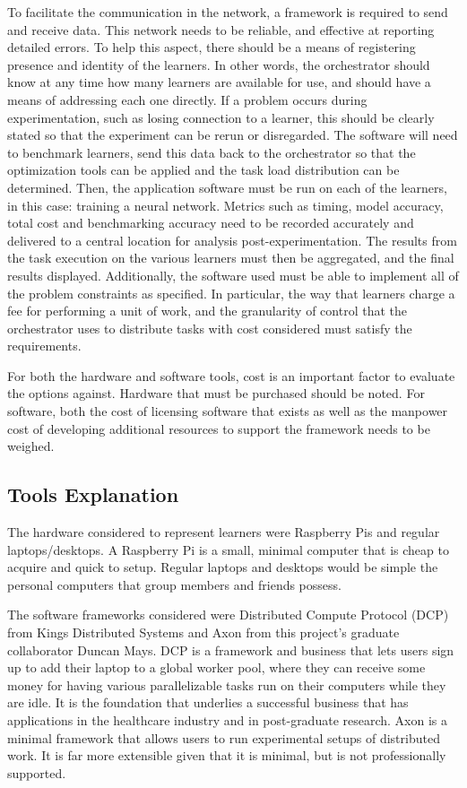 \documentclass[../mthe-493-final-project.tex]{subfiles}
\begin{document}
    To facilitate the communication in the network, a framework is required to send and receive data. This network needs to be reliable, and effective at reporting detailed errors. To help this aspect, there should be a means of registering presence and identity of the learners. In other words, the orchestrator should know at any time how many learners are available for use, and should have a means of addressing each one directly. If a problem occurs during experimentation, such as losing connection to a learner, this should be clearly stated so that the experiment can be rerun or disregarded. The software will need to benchmark learners, send this data back to the orchestrator so that the optimization tools can be applied and the task load distribution can be determined. Then, the application software must be run on each of the learners, in this case: training a neural network. Metrics such as timing, model accuracy, total cost and benchmarking accuracy need to be recorded accurately and delivered to a central location for analysis post-experimentation. The results from the task execution on the various learners must then be aggregated, and the final results displayed. Additionally, the software used must be able to implement all of the problem constraints as specified. In particular, the way that learners charge a fee for performing a unit of work, and the granularity of control that the orchestrator uses to distribute tasks with cost considered must satisfy the requirements.
    
    For both the hardware and software tools, cost is an important factor to evaluate the options against. Hardware that must be purchased should be noted. For software, both the cost of licensing software that exists as well as the manpower cost of developing additional resources to support the framework needs to be weighed. 
    
    \subsection{Tools Explanation}
    The hardware considered to represent learners were Raspberry Pis and regular laptops/desktops. A Raspberry Pi is a small, minimal computer that is cheap to acquire and quick to setup. Regular laptops and desktops would be simple the personal computers that group members and  friends possess. 
    
    The software frameworks considered were Distributed Compute Protocol (DCP) from Kings Distributed Systems and Axon from this project's graduate collaborator Duncan Mays. DCP is a framework and business that lets users sign up to add their laptop to a global worker pool, where they can receive some money for having various parallelizable tasks run on their computers while they are idle. It is the foundation that underlies a successful business that has applications in the healthcare industry and in post-graduate research. Axon is a minimal framework that allows users to run experimental setups of distributed work. It is far more extensible given that it is minimal, but is not professionally supported.
\end{document}
